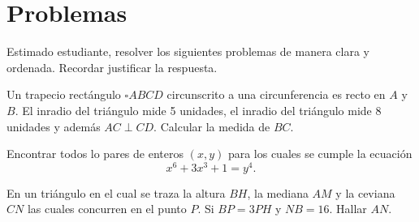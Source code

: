 \section{\large Problemas}

Estimado estudiante, resolver los siguientes problemas de manera clara y ordenada.
Recordar justificar la respuesta.

\begin{section-problem}
    Un trapecio rectángulo $\square ABCD$ circunscrito a una circunferencia es recto en $A$ y $B$.
    El inradio del triángulo  mide 5 unidades, el inradio del triángulo  mide 8 unidades y además $AC \perp CD$.
    Calcular la medida de $BC$.
\end{section-problem}

\begin{section-problem}
    Encontrar todos lo pares de enteros $(x, y)$ para los cuales se cumple la ecuación
    \[
        x^6 + 3x^3 + 1 = y^4.
    \]
\end{section-problem}

\begin{section-problem}
    En un triángulo  en el cual se traza la altura $BH$, la mediana $AM$ y la ceviana $CN$ las cuales concurren en el punto $P$.
    Si $BP = 3PH$ y $NB = 16$.
    Hallar $AN$.
\end{section-problem}